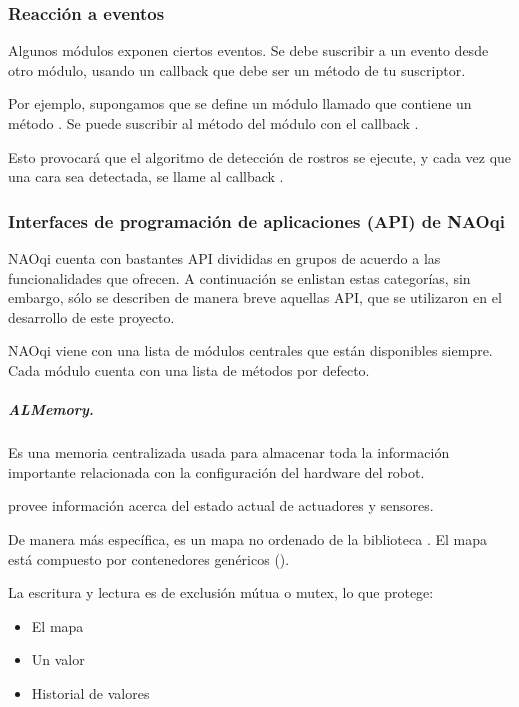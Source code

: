 \subsubsection{Reacción a eventos}
\label{\detokenize{chapter_one/naoqi:reaccion-a-eventos}}
Algunos módulos exponen ciertos eventos. Se debe suscribir a un evento desde otro módulo,
usando un callback que debe ser un método de tu suscriptor.

Por ejemplo, supongamos que se define un módulo llamado  que
contiene un método .
Se puede suscribir  al método  del módulo
 con el callback .

Esto provocará que el algoritmo de detección de rostros se ejecute, y cada vez
que una cara sea detectada, se llame al callback .


\subsubsection{Interfaces de programación de aplicaciones (API) de NAOqi}
\label{\detokenize{chapter_one/naoqi:interfaces-de-programacion-de-aplicaciones-api-de-naoqi}}
NAOqi cuenta con bastantes API divididas en grupos de acuerdo a las
funcionalidades que ofrecen. A continuación se enlistan estas
categorías, sin embargo, sólo se describen de manera breve aquellas API,
que se utilizaron en el desarrollo de este proyecto.

NAOqi viene con una lista de módulos centrales que están disponibles siempre.
Cada módulo cuenta con una lista de métodos por defecto.


\subparagraph{ALMemory.}
\label{\detokenize{chapter_one/naoqi:id1}}
Es una memoria centralizada usada para almacenar toda la información importante
relacionada con la configuración del hardware del robot.

 provee información acerca del estado actual de actuadores y sensores.

De manera más específica,  es un mapa no ordenado de la biblioteca
. El mapa está compuesto por
contenedores genéricos ().

La escritura y lectura es de exclusión mútua o mutex, lo que protege:
\begin{itemize}
\item {} 
El mapa

\item {} 
Un valor

\item {} 
Historial de valores

\end{itemize}

